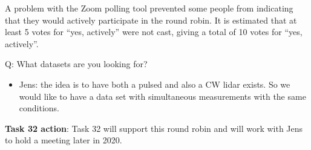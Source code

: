 A problem with the Zoom polling tool prevented some people from indicating that they would actively participate in the round robin. It is estimated that at least 5 votes for \enquote{yes, actively} were not cast, giving a total of 10 votes for \enquote{yes, actively}.

Q: What datasets are you looking for?

\begin{itemize}
\item Jens: the idea is to have both a pulsed and also a CW lidar exists. So we would like to have a data set with simultaneous measurements with the same conditions.
\end{itemize}

\textbf{Task 32 action}: Task 32 will support this round robin and will work with Jens to hold a meeting later in 2020.